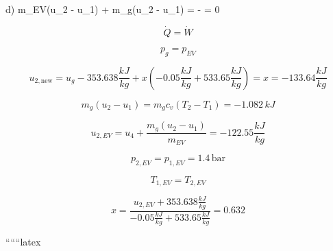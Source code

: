 d) \quad m_{EV}(u_2 - u_1) + m_g(u_2 - u_1) =  -  = 0

\[
\dot{Q} = \dot{W}
\]

\[
p_g = p_{EV}
\]

\[
u_{2, \text{new}} = u_g - 353.638 \frac{kJ}{kg} + x \left( -0.05 \frac{kJ}{kg} + 533.65 \frac{kJ}{kg} \right) = x = -133.64 \frac{kJ}{kg}
\]

\[
m_g(u_2 - u_1) = m_g c_v (T_2 - T_1) = -1.082 \, kJ
\]

\[
u_{2, EV} = u_4 + \frac{m_g (u_2 - u_1)}{m_{EV}} = -122.55 \frac{kJ}{kg}
\]

\[
p_{2, EV} = p_{1, EV} = 1.4 \, \text{bar}
\]

\[
T_{1, EV} = T_{2, EV}
\]

\[
x = \frac{u_{2, EV} + 353.638 \frac{kJ}{kg}}{-0.05 \frac{kJ}{kg} + 533.65 \frac{kJ}{kg}} = 0.632
\]

``````latex